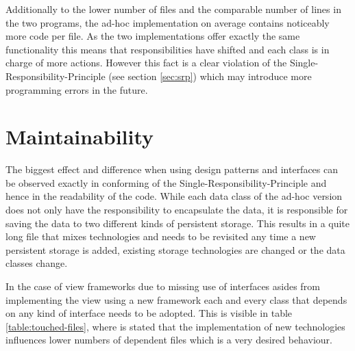Additionally to the lower number of files and the comparable number of lines in the two programs, the ad-hoc implementation on average contains noticeably more code per file. As the two implementations offer exactly the same functionality this means that responsibilities have shifted and each class is in charge of more actions. However this fact is a clear violation of the Single-Responsibility-Principle (see section \ref{sec:srp}) which may introduce more programming errors in the future. 

\section{Maintainability}
The biggest effect and difference when using design patterns and interfaces can be observed exactly in conforming of the Single-Responsibility-Principle and hence in the readability of the code. While each data class of the ad-hoc version does not only have the responsibility to encapsulate the data, it is responsible for saving the data to two different kinds of persistent storage. This results in a quite long file that mixes technologies and needs to be revisited any time a new persistent storage is added, existing storage technologies are changed or the data classes change. 

In the case of view frameworks due to missing use of interfaces asides from implementing the view using a new framework each and every class that depends on any kind of interface needs to be adopted. This is visible in table \ref{table:touched-files}, where is stated that the implementation of new technologies influences lower numbers of dependent files which is a very desired behaviour. 